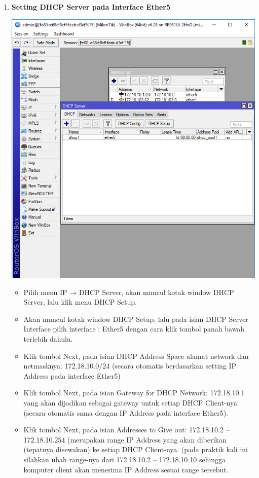\documentclass[a4paper,12pt]{article}
\begin{document}
\begin{enumerate}[label=\textbf{\arabic*.}]
    \item \textbf{Setting DHCP Server pada Interface Ether5}
        \begin{center}
            \includegraphics[width=0.8\linewidth]{image5.png}
        \end{center}
        \begin{itemize}
            \item Pilih menu IP → DHCP Server, akan muncul kotak window DHCP Server, lalu klik menu DHCP Setup.
            \item Akan muncul kotak window DHCP Setup, lalu pada isian DHCP Server Interface pilih interface : Ether5 dengan cara klik tombol panah bawah  terlebih dahulu.
            \item Klik tombol Next, pada isian DHCP Address Space alamat network dan netmasknya: 172.18.10.0/24 (secara otomatis berdasarkan setting IP Address pada interface Ether5)
            \item Klik tombol Next, pada isian Gateway for DHCP Network: 172.18.10.1 yang akan dijadikan sebagai gateway untuk setiap DHCP Client-nya (secara otomatis sama dengan IP Address pada interface Ether5).
            \item Klik tombol Next, pada isian Addresses to Give out: 172.18.10.2 – 172.18.10.254 (merupakan range IP Address yang akan diberikan (tepatnya disewakan) ke setiap DHCP Client-nya. (pada praktik kali ini silahkan ubah range-nya dari 172.18.10.2 – 172.18.10.10 sehingga komputer client akan menerima IP Address sesuai range tersebut.

\end{itemize}
\end{enumerate}
\end{document}
